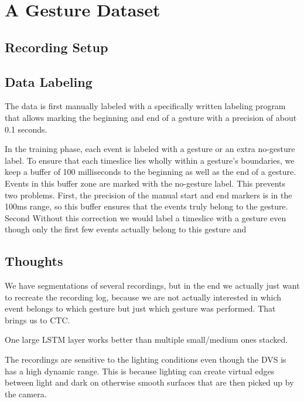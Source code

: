 \chapter{A Gesture Dataset}
\label{cha:gesture-dataset}

\section{Recording Setup}
\label{sec:setup}

\section{Data Labeling}
\label{sec:data-labeling}

The data is first manually labeled with a specifically written labeling program that allows marking the beginning and end of a gesture with a precision of about 0.1 seconds.

In the training phase, each event is labeled with a gesture or an extra no-gesture label.
To ensure that each timeslice lies wholly within a gesture's boundaries, we keep a buffer of 100 milliseconds to the beginning as well as the end of a gesture.
Events in this buffer zone are marked with the no-gesture label.
This prevents two problems.
First, the precision of the manual start and end markers is in the 100ms range, so this buffer ensures that the events truly belong to the gesture.
Second
Without this correction we would label a timeslice with a gesture even though only the first few events actually belong to this gesture and

\section{Thoughts}
\label{sec:thoughts}

We have segmentations of several recordings, but in the end we actually just want to recreate the recording log, because we are not actually interested in which event belongs to which gesture but just which gesture was performed.
That brings us to CTC.

One large LSTM layer works better than multiple small/medium ones stacked.

The recordings are sensitive to the lighting conditions even though the DVS is has a high dynamic range.
This is because lighting can create virtual edges between light and dark on otherwise smooth surfaces that are then picked up by the camera.

